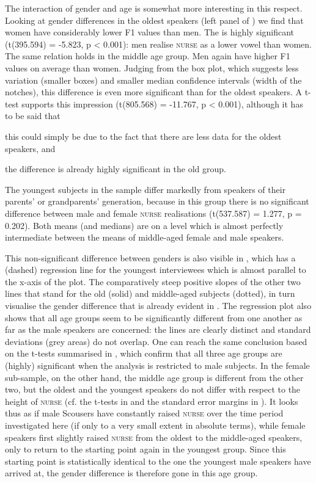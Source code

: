 The interaction of gender and age is somewhat more interesting in this respect.
Looking at gender differences in the oldest speakers (left panel of ) we find that women have considerably lower F1 values than men.
The  is highly significant (t(395.594) = -5.823, p < 0.001): men realise \textsc{nurse} as a lower vowel than women.
The same relation holds in the middle age group.
Men again have higher F1 values on average than women.
Judging from the box plot, which suggests less variation (smaller boxes) and smaller median confidence intervals (width of the notches), this difference is even more significant than for the oldest speakers.
A t-test supports this impression (t(805.568) = -11.767, p < 0.001), although it has to be said that
\begin{inparaenum}[(a)]
	\item this could simply be due to the fact that there are less data for the oldest speakers, and
	\item the difference is already highly significant in the old group.
\end{inparaenum}
The youngest subjects in the sample differ markedly from speakers of their parents' or grandparents' generation, because in this group there is no significant difference between male and female \textsc{nurse} realisations (t(537.587) = 1.277, p = 0.202).
Both means (and medians) are on a level which is almost perfectly intermediate between the means of middle-aged female and male speakers.

This non-significant difference between genders is also visible in , which has a (dashed) regression line for the youngest interviewees which is almost parallel to the x-axis of the plot.
The comparatively steep positive slopes of the other two lines that stand for the old (solid) and middle-aged subjects (dotted), in turn visualise the gender difference that is already evident in .
The regression plot also shows that all age groups seem to be significantly different from one another as far as the male speakers are concerned: the lines are clearly distinct and standard deviations (grey areas) do not overlap.
One can reach the same conclusion based on the t-tests summarised in , which confirm that all three age groups are (highly) significant when the analysis is restricted to male subjects.
In the female sub-sample, on the other hand, the middle age group is different from the other two, but the oldest and the youngest speakers do not differ with respect to the height of \textsc{nurse} (cf. the t-tests in  and the standard error margins in ).
It looks thus as if male Scousers have constantly raised \textsc{nurse} over the time period investigated here (if only to a very small extent in absolute terms), while female speakers first slightly raised \textsc{nurse} from the oldest to the middle-aged speakers, only to return to the starting point again in the youngest group.
Since this starting point is statistically identical to the one the youngest male speakers have arrived at, the gender difference is therefore gone in this age group.

